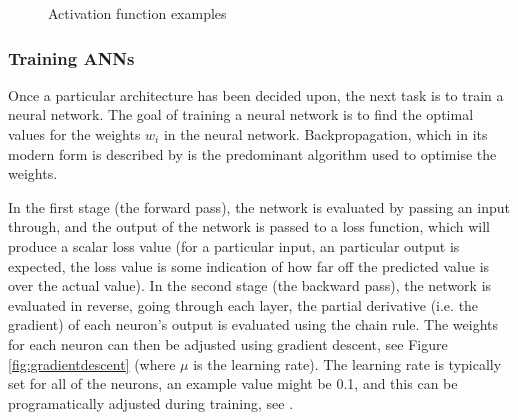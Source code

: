         \begin{figure}[h]
            \centering


        \caption{Activation function examples}
        \label{fig:activationeg}    
    \end{figure}

          \subsubsection{Training ANNs}
          Once a particular architecture has been decided upon, the next task is to train a neural network. The goal of training a neural network is to find the optimal values for the weights $w_i$ in the neural network. Backpropagation, which in its modern form is described by \cite{rumelhart1988learning} is the predominant algorithm used to optimise the weights.

          In the first stage (the forward pass), the network is evaluated by passing an input through, and the output of the network is passed to a loss function, which will produce a scalar loss value (for a particular input, an particular output is expected, the loss value is some indication of how far off the predicted value is over the actual value). In the second stage (the backward pass), the network is evaluated in reverse, going through each layer, the partial derivative (i.e. the gradient) of each neuron's output is evaluated using the chain rule. The weights for each neuron can then be adjusted using gradient descent, see Figure \ref{fig:gradientdescent} (where $\mu$ is the learning rate). The learning rate is typically set for all of the neurons, an example value might be 0.1, and this can be programatically adjusted during training, see \cite{learningratetypes}.

